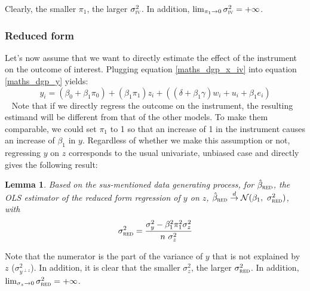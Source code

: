 \documentclass[usletter, 12pt]{article}
\newtheorem{lemma}{Lemma}
\begin{document}
			Clearly, the smaller $\pi_{1}$, the larger $\sigma_{\textsc{iv}}^{2}$. In addition, $\lim_{\pi_{1}\to 0} \sigma_{\textsc{iv}}^{2} = + \infty$.
			

				 

		\subsubsection{Reduced form}
		
			Let's now assume that we want to directly estimate the effect of the instrument on the outcome of interest. Plugging equation \ref{maths_dgp_x_iv} into equation \ref{maths_dgp_y} yields:			
				\[
					y_{i} = (\beta_{0} + \beta_{1}\pi_0) + (\beta_{1}\pi_{1}) z_{i} + ((\delta + \beta_{1}\gamma) w_{i} + u_{i} + \beta_{1}e_{i})
				\]
				~
				Note that if we directly regress the outcome on the instrument, the resulting estimand will be different from that of the other models. To make them comparable, we could set $\pi_{1}$ to 1 so that an increase of 1 in the instrument causes an increase of $\beta_{1}$ in $y$. Regardless of whether we make this assumption or not, regressing $y$ on $z$ corresponds to the usual univariate, unbiased case and directly gives the following result:
				
				\begin{lemma}\label{lemma_red}
					Based on the sus-mentioned data generating process, for $\hat{\beta}_{\textsc{red}}$, the OLS estimator of the reduced form regression of $y$ on $z$,  $\hat{\beta}_{\textsc{red}} \overset{d}{\to} \mathcal{N}(\beta_{1}, \ \sigma_{\textsc{red}}^{2})$, with
					\[
						\sigma_{\textsc{red}}^{2} = \dfrac{\sigma_{y}^{2} - \beta_{1}^{2}\pi_{1}^{2}\sigma_{z}^{2}}{n \ \sigma_{z}^{2}}
					\]
				\end{lemma}
				
				Note that the numerator is the part of the variance of $y$ that is not explained by $z$ ($\sigma^{2}_{y^{\perp z}}$). In addition, it is clear that the smaller $\sigma_{z}^{2}$, the larger $\sigma_{\textsc{red}}^{2}$. In addition, $\lim_{\sigma_{z}\to 0} \sigma_{\textsc{red}}^{2} = + \infty$.\\
				
\end{document}
